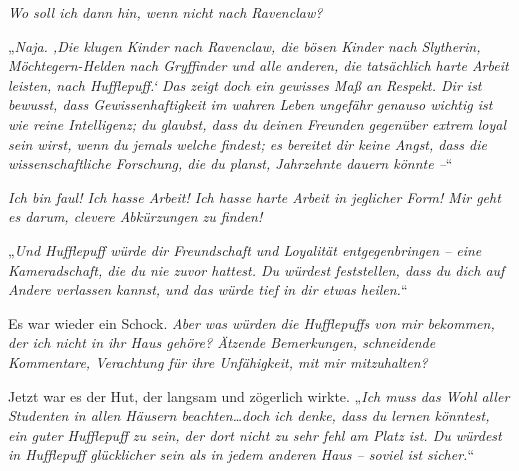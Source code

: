 \emph{Wo soll ich dann hin, wenn nicht nach Ravenclaw? }

„\emph{Naja. ‚Die klugen Kinder nach Ravenclaw, die bösen Kinder nach Slytherin, Möchtegern-Helden nach Gryffinder und alle anderen, die tatsächlich harte Arbeit leisten, nach Hufflepuff.‘ Das zeigt doch ein gewisses Maß an Respekt. Dir ist bewusst, dass Gewissenhaftigkeit im wahren Leben ungefähr genauso wichtig ist wie reine Intelligenz; du glaubst, dass du deinen Freunden gegenüber extrem loyal sein wirst, wenn du jemals welche findest; es bereitet dir keine Angst, dass die wissenschaftliche Forschung, die du planst, Jahrzehnte dauern könnte –}“

\emph{Ich bin faul! Ich hasse Arbeit! Ich hasse harte Arbeit in jeglicher Form! Mir geht es darum, clevere Abkürzungen zu finden! }

„\emph{Und Hufflepuff würde dir Freundschaft und Loyalität entgegenbringen – eine Kameradschaft, die du nie zuvor hattest. Du würdest feststellen, dass du dich auf Andere verlassen kannst, und das würde tief in dir etwas heilen.}“

Es war wieder ein Schock. \emph{Aber was würden die Hufflepuffs von \emph{mir} bekommen, der ich nicht in ihr Haus gehöre? Ätzende Bemerkungen, schneidende Kommentare, Verachtung für ihre Unfähigkeit, mit mir mitzuhalten?}

Jetzt war es der Hut, der langsam und zögerlich wirkte. „\emph{Ich muss das Wohl aller Studenten in allen Häusern beachten…doch ich denke, dass du lernen könntest, ein guter Hufflepuff zu sein, der dort nicht zu sehr fehl am Platz ist. Du würdest in Hufflepuff glücklicher sein als in jedem anderen Haus – soviel ist sicher.}“

